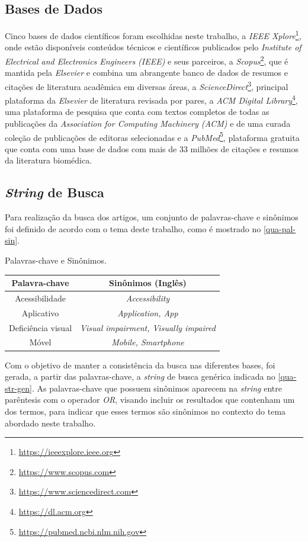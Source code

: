 \subsection{Bases de Dados}
Cinco bases de dados científicos foram escolhidas neste trabalho, a \emph{IEEE Xplore}\footnote{\url{https://ieeexplore.ieee.org}}, onde estão disponíveis conteúdos técnicos e científicos publicados pelo \emph{Institute of Electrical and Electronics Engineers (IEEE)} e seus parceiros,
a \emph{Scopus}\footnote{\url{https://www.scopus.com}}, que é mantida pela \emph{Elsevier} e combina um abrangente banco de dados de resumos e citações de literatura acadêmica em diversas áreas, a \emph{ScienceDirect}\footnote{\url{https://www.sciencedirect.com}}, principal plataforma da \emph{Elsevier} de literatura revisada por pares,
a \emph{ACM Digital Library}\footnote{\url{https://dl.acm.org}}, uma plataforma de pesquisa que conta com textos completos de todas as publicações da \emph{Association for Computing Machinery (ACM)} e de uma curada coleção de publicações de editoras selecionadas e a \emph{PubMed}\footnote{\url{https://pubmed.ncbi.nlm.nih.gov}},
plataforma gratuita que conta com uma base de dados com mais de 33 milhões de citações e resumos da literatura biomédica.

\subsection{\emph{String} de Busca}
Para realização da busca dos artigos, um conjunto de palavras-chave e sinônimos foi definido de acordo com o tema deste trabalho, como é mostrado no \autoref{qua-pal-sin}.

\begin{quadro}[htb]
\caption{\label{qua-pal-sin}Palavras-chave e Sinônimos.}
\begin{tabular}{|c|c|}
    \hline
   \textbf{Palavra-chave} & \textbf{Sinônimos (Inglês)} \\ \hline
    Acessibilidade & \emph{Accessibility} \\ \hline
    Aplicativo & \emph{Application, App} \\ \hline
    Deficiência visual & \emph{Visual impairment, Visually impaired} \\ \hline
    Móvel & \emph{Mobile, Smartphone} \\ \hline
\end{tabular}
\end{quadro}

Com o objetivo de manter a consistência da busca nas diferentes bases, foi gerada, a partir das palavras-chave, a \emph{string} de busca genérica indicada no \autoref{qua-str-gen}.
As palavras-chave que possuem sinônimos aparecem na \emph{string} entre parêntesis com o operador \emph{OR}, visando incluir os resultados que contenham um dos termos, para indicar que esses termos são sinônimos no contexto do tema abordado neste trabalho.

